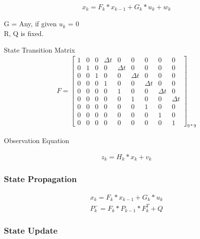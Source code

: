 \documentclass[12pt]{article}  %
\begin{document}
\begin{equation}
    \begin{aligned}
x_k=F_k*x_{k-1}+G_k*u_k+w_k
\end{aligned}
\end{equation}

\indent    G = Any, if given $u_k$ = 0\\
\indent   R, Q is fixed.

\indent State Transition Matrix
\begin{equation}
    \begin{aligned}
F = \begin{bmatrix}
    1&0&0&\Delta t&0&0&0&0&0
    \\0&1&0&0&\Delta t&0&0&0&0
    \\0&0&1&0&0&\Delta t&0&0&0
    \\0&0&0&1&0&0&\Delta t&0&0
    \\0&0&0&0&1&0&0&\Delta t&0
    \\0&0&0&0&0&1&0&0&\Delta t
    \\0&0&0&0&0&0&1&0&0
    \\0&0&0&0&0&0&0&1&0
    \\0&0&0&0&0&0&0&0&1
    \end{bmatrix}_{9*9}
\end{aligned}
\end{equation}

\indent Observation Equation

\begin{equation}
    \begin{aligned}
z_k=H_k*x_k+v_k
\end{aligned}
\end{equation}

\indent 

\subsubsection{State Propagation}
\begin{equation}
    \begin{aligned}
x_k=F_k*x_{k-1}+G_k*u_k
\end{aligned}
\end{equation}
\begin{equation}
    \begin{aligned}
        P^-_k=F_k*P_{k-1}*F^T_k+Q
    \end{aligned}
\end{equation}

\subsubsection{State Update}
\end{document}
